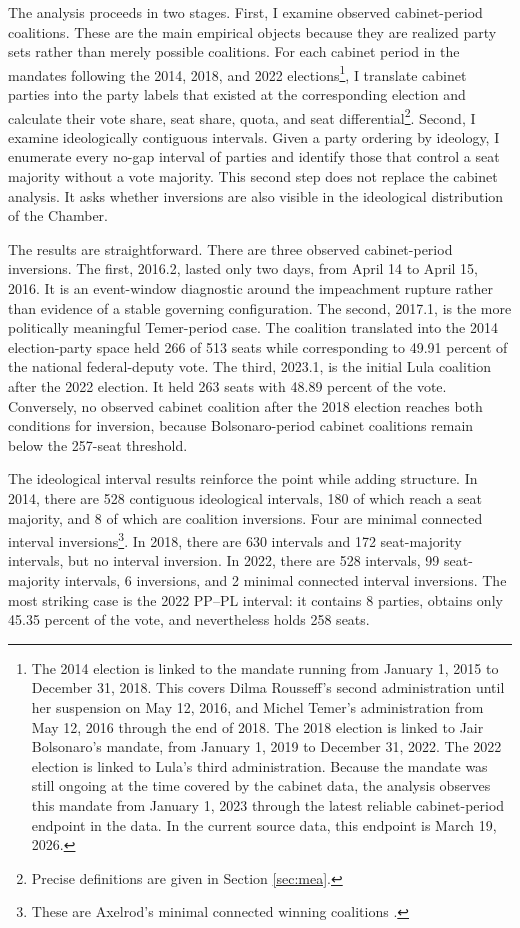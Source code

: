 \documentclass[11pt]{article}
\begin{document}
The analysis proceeds in two stages. First, I examine observed cabinet-period
coalitions. These are the main empirical objects because they are realized party
sets rather than merely possible coalitions. For each cabinet period in the
mandates following the 2014, 2018, and 2022 elections\footnote{The 2014 election is linked to the mandate running from January 1, 2015 to December 31, 2018. This covers Dilma Rousseff’s second administration until her suspension on May 12, 2016, and Michel Temer’s administration from May 12, 2016 through the end of 2018. The 2018 election is linked to Jair Bolsonaro’s mandate, from January 1, 2019 to December 31, 2022. The 2022 election is linked to Lula’s third administration. Because the mandate was still ongoing at the time covered by the cabinet data, the analysis observes this mandate from January 1, 2023 through the latest reliable cabinet-period endpoint in the data. In the current source data, this endpoint is March 19, 2026.}, I translate cabinet
parties into the party labels that existed at the corresponding election and
calculate their vote share, seat share, quota, and seat
differential\footnote{Precise definitions are given in Section \ref{sec:mea}.}.
Second, I examine ideologically contiguous intervals. Given a party ordering by
ideology, I enumerate every no-gap interval of parties and identify those that
control a seat majority without a vote majority. This second step does not
replace the cabinet analysis. It asks whether inversions are also visible in the
ideological distribution of the Chamber.

The results are straightforward. There are three observed cabinet-period
inversions. The first, 2016.2, lasted only two days, from April 14 to April 15,
2016. It is an event-window diagnostic around the impeachment rupture rather
than evidence of a stable governing configuration. The second, 2017.1, is the
more politically meaningful Temer-period case. The coalition translated into the
2014 election-party space held 266 of 513 seats while corresponding to 49.91
percent of the national federal-deputy vote. The third, 2023.1, is the initial
Lula coalition after the 2022 election. It held 263 seats with 48.89 percent of
the vote. Conversely, no observed cabinet coalition after the 2018 election
reaches both conditions for inversion, because Bolsonaro-period cabinet
coalitions remain below the 257-seat threshold.

The ideological interval results reinforce the point while adding structure. In
2014, there are 528 contiguous ideological intervals, 180 of which reach a seat
majority, and 8 of which are coalition inversions. Four are minimal connected
interval inversions\footnote{These are Axelrod's minimal connected winning coalitions \parencite{axelrod1970conflict}.}. In 2018, there are 630 intervals and 172 seat-majority intervals,
but no interval inversion. In 2022, there are 528 intervals, 99 seat-majority
intervals, 6 inversions, and 2 minimal connected interval inversions. The most striking
case is the 2022 PP--PL interval: it contains 8 parties, obtains only 45.35
percent of the vote, and nevertheless holds 258 seats.
\end{document}
